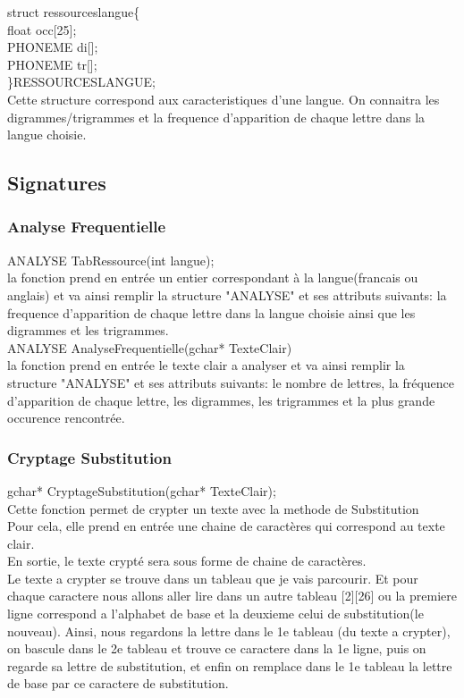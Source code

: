 \documentclass[a4]{article}
\begin{document}
	struct ressourceslangue\{ \\
		float occ[25];\\
		PHONEME di[];\\
		PHONEME tr[];\\
	\}RESSOURCESLANGUE;\\
	Cette structure correspond aux caracteristiques d'une langue. On connaitra
	les digrammes/trigrammes et la frequence d'apparition de chaque lettre dans la langue choisie.
		\subsection{Signatures}
		
	
	\subsubsection{Analyse Frequentielle}
	ANALYSE TabRessource(int langue);\\
		la fonction prend en entrée un entier correspondant à la langue(francais ou anglais)
		et va ainsi remplir la structure "ANALYSE" et ses attributs suivants:
		la frequence d'apparition de chaque lettre dans la langue choisie ainsi que les digrammes
		et les trigrammes.\\
		
		
		
	ANALYSE AnalyseFrequentielle(gchar* TexteClair)\\
		la fonction prend en entrée le texte clair a analyser et va ainsi remplir la structure "ANALYSE" et 
		ses attributs suivants:
		le nombre de lettres, la fréquence d'apparition de chaque lettre, les digrammes, les trigrammes
		et la plus grande occurence rencontrée.\\
		
	\subsubsection{Cryptage Substitution}
	gchar* CryptageSubstitution(gchar* TexteClair);\\
		Cette fonction permet de crypter un texte avec la methode de Substitution\\
		Pour cela, elle prend en entrée une chaine de caractères qui correspond au texte clair.\\
		En sortie, le texte crypté sera sous forme de chaine de caractères.\\
		Le texte a crypter se trouve dans un tableau que je vais parcourir. Et pour chaque caractere 
		nous allons aller lire dans un autre tableau [2][26] ou la premiere ligne correspond a l'alphabet
		de base et la deuxieme celui de substitution(le nouveau). Ainsi, nous regardons la lettre dans 
		le 1e tableau (du texte a crypter), on bascule dans le 2e tableau et trouve ce caractere dans la
		1e ligne, puis on regarde sa lettre de substitution, et enfin on remplace dans le 1e tableau 
		la lettre de base par ce caractere de substitution.
		
\end{document}

